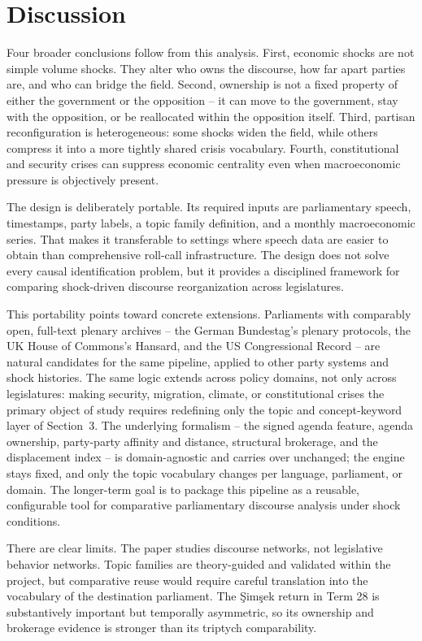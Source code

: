 \documentclass[11pt]{article}
\begin{document}
\section{Discussion}
Four broader conclusions follow from this analysis. First, economic shocks are not simple volume shocks. They alter who owns the discourse, how far apart parties are, and who can bridge the field. Second, ownership is not a fixed property of either the government or the opposition -- it can move to the government, stay with the opposition, or be reallocated within the opposition itself. Third, partisan reconfiguration is heterogeneous: some shocks widen the field, while others compress it into a more tightly shared crisis vocabulary. Fourth, constitutional and security crises can suppress economic centrality even when macroeconomic pressure is objectively present.

The design is deliberately portable. Its required inputs are parliamentary speech, timestamps, party labels, a topic family definition, and a monthly macroeconomic series. That makes it transferable to settings where speech data are easier to obtain than comprehensive roll-call infrastructure. The design does not solve every causal identification problem, but it provides a disciplined framework for comparing shock-driven discourse reorganization across legislatures.

This portability points toward concrete extensions. Parliaments with comparably open, full-text plenary archives -- the German Bundestag's plenary protocols, the UK House of Commons's Hansard, and the US Congressional Record -- are natural candidates for the same pipeline, applied to other party systems and shock histories. The same logic extends across policy domains, not only across legislatures: making security, migration, climate, or constitutional crises the primary object of study requires redefining only the topic and concept-keyword layer of Section~3. The underlying formalism -- the signed agenda feature, agenda ownership, party-party affinity and distance, structural brokerage, and the displacement index -- is domain-agnostic and carries over unchanged; the engine stays fixed, and only the topic vocabulary changes per language, parliament, or domain. The longer-term goal is to package this pipeline as a reusable, configurable tool for comparative parliamentary discourse analysis under shock conditions.

There are clear limits. The paper studies discourse networks, not legislative behavior networks. Topic families are theory-guided and validated within the project, but comparative reuse would require careful translation into the vocabulary of the destination parliament. The \c{S}im\c{s}ek return in Term 28 is substantively important but temporally asymmetric, so its ownership and brokerage evidence is stronger than its triptych comparability.
\end{document}
